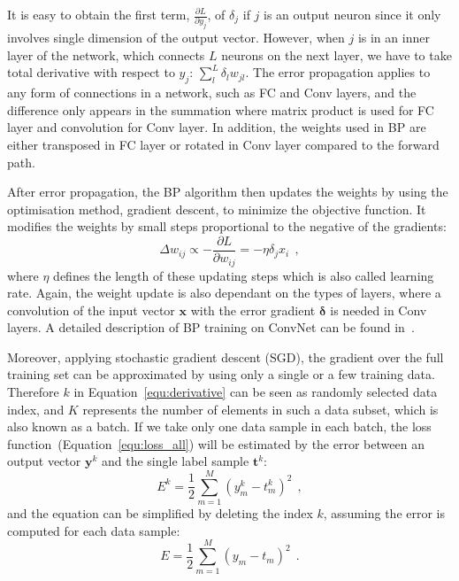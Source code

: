 It is easy to obtain the first term, $ \frac{\partial L}{\partial y_j}  $, of $ \delta_j $ if $j$ is an output neuron since it only involves single dimension of the output vector.
However, when $j$ is in an inner layer of the network, which connects $L$ neurons on the next layer, we have to take total derivative with respect to $y_j$: $\sum_l^L \delta_l w_{jl}$.
The error propagation applies to any form of connections in a network, such as FC and Conv layers, and the difference only appears in the summation where matrix product is used for FC layer and convolution for Conv layer.
In addition, the weights used in BP are either transposed in FC layer or rotated in Conv layer compared to the forward path.

After error propagation, the BP algorithm then updates the weights by using the optimisation method, gradient descent, to minimize the objective function.
It modifies the weights by small steps proportional to the negative of the gradients:
\begin{equation}
\Delta w_{ij} \propto -\frac{\partial L}{\partial w_{ij}} = -\eta \delta_j x_i~~,
\label{equ:delta_w}
\end{equation}
where $\eta$ defines the length of these updating steps which is also called learning rate.
Again, the weight update is also dependant on the types of layers, where a convolution of the input vector $\mathbf{x}$ with the error gradient  $\mathbf{\delta}$ is needed in Conv layers.
A detailed description of BP training on ConvNet can be found in~\cite{bouvrie2006notes}.

Moreover, applying stochastic gradient descent (SGD), the gradient over the full training set can be approximated by using only a single or a few training data.
Therefore $k$ in Equation~\ref{equ:derivative} can be seen as randomly selected data index, and $K$ represents the number of elements in such a data subset, which is also known as a batch.
If we take only one data sample in each batch, the loss function~(Equation~\ref{equ:loss_all}) will be estimated by the error between an output vector $\mathbf{y}^k$ and the single label sample $\mathbf{t}^k$:
\begin{equation}
E^k = \frac{1}{2}\sum_{m=1}^M (y^{k}_{m}-t^{k}_{m})^{2}~~,
\label{equ:error_conv}
\end{equation}
and the equation can be simplified by deleting the index $k$, assuming the error is computed for each data sample:
\begin{equation}
E = \frac{1}{2}\sum_{m=1}^M (y_{m}-t_{m})^{2}~~.
\label{equ:error_non}
\end{equation}


